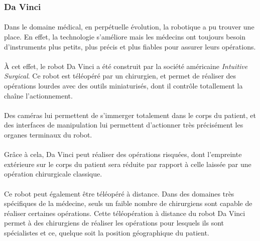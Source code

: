 \documentclass[a4paper,10pt]{article}
\begin{document}
            \subsubsection{Da Vinci}
                \paragraph{}
                    Dans le domaine médical, en perpétuelle évolution, la robotique a pu trouver 
                    une place. En effet, la technologie s'améliore mais les médecins ont toujours 
                    besoin d'instruments plus petits, plus précis et plus fiables pour assurer 
                    leurs opérations. 
                    
                \paragraph{}
                    À cet effet, le robot Da Vinci a été construit par la société américaine
                    \textit{Intuitive Surgical}. Ce robot est téléopéré par un chirurgien, 
                    et permet de réaliser des opérations lourdes avec des outils miniaturisés, 
                    dont il contrôle totallement la chaîne l'actionnement. 
                
                \paragraph{}
                    Des caméras lui permettent de s'immerger totalement dans le corps du 
                    patient, et des interfaces de manipulation lui permettent d'actionner 
                    très précisément les organes terminaux du robot. 
                    
                \paragraph{}
                    Grâce à cela, Da Vinci peut réaliser des opérations risquées, dont 
                    l'empreinte extérieure sur le corps du patient sera réduite par 
                    rapport à celle laissée par une opération chirurgicale classique. 
                    
                \paragraph{}
                    Ce robot peut également être téléopéré à distance. Dans des domaines 
                    très spécifiques de la médecine, seuls un faible nombre de chirurgiens 
                    sont capable de réaliser certaines opérations. Cette téléopération
                    à distance du robot Da Vinci permet à des chirurgiens de réaliser les
                    opérations pour lesquels ils sont spécialistes et ce, quelque soit la position
                    géographique du patient.
\end{document}
